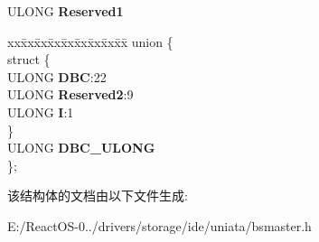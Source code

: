 \begin{DoxyCompactItemize}
\begin{tabbing}
\end{tabbing}\item 
\mbox{\label{struct___i_d_e___a_h_c_i___p_r_d___e_n_t_r_y_aec8cfea21f4bd4ac6bc8ef49e8033be6}} 
U\+L\+O\+NG {\bfseries Reserved1}
\item 
\mbox{\label{struct___i_d_e___a_h_c_i___p_r_d___e_n_t_r_y_a15c69887e43b3275b74487252faa56c6}} 
\begin{tabbing}
xx\=xx\=xx\=xx\=xx\=xx\=xx\=xx\=xx\=\kill
union \{\\
\mbox{\label{union___i_d_e___a_h_c_i___p_r_d___e_n_t_r_y_1_1_0D1050_aaa4aa99d0e74543726daef58a3b9f3af}} 
\>struct \{\\
\>\>ULONG {\bfseries DBC}:22\\
\>\>ULONG {\bfseries Reserved2}:9\\
\>\>ULONG {\bfseries I}:1\\
\>\} \\
\>ULONG {\bfseries DBC\_ULONG}\\
\}; \\

\end{tabbing}\end{DoxyCompactItemize}


该结构体的文档由以下文件生成\+:\begin{DoxyCompactItemize}
\item 
E\+:/\+React\+O\+S-\/0../drivers/storage/ide/uniata/bsmaster.\+h\end{DoxyCompactItemize}
